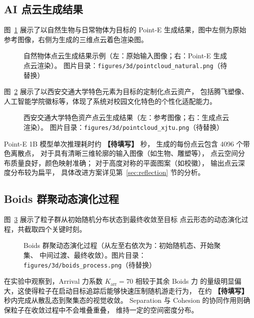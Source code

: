 \subsection{AI 点云生成结果}

图~\ref{fig:pointcloud_natural} 展示了以自然生物与日常物体为目标的
Point-E 生成结果，图中左侧为原始参考图像，右侧为生成的三维点云着色渲染图。

\begin{figure}[htbp]
  \centering
  \fbox{\rule{0pt}{5cm}\rule{14cm}{0pt}}
  \caption{自然物体点云生成结果示例（左：原始输入图像；右：Point-E 生成点云渲染）。
           图片目录：\texttt{figures/3d/pointcloud\_natural.png}（待替换）}
  \label{fig:pointcloud_natural}
\end{figure}

图~\ref{fig:pointcloud_xjtu} 展示了以西安交通大学特色元素为目标的定制化点云资产，
包括腾飞塑像、人工智能学院徽标等，体现了系统对校园文化特色的个性化适配能力。

\begin{figure}[htbp]
  \centering
  \fbox{\rule{0pt}{5cm}\rule{14cm}{0pt}}
  \caption{西安交通大学特色资产点云生成结果（左：参考图像；右：生成点云渲染）。
           图片目录：\texttt{figures/3d/pointcloud\_xjtu.png}（待替换）}
  \label{fig:pointcloud_xjtu}
\end{figure}

Point-E 1B 模型单次推理耗时约 \textbf{【待填写】} 秒，
生成的每份点云包含 4096 个带色离散点，
对于具有清晰三维轮廓的输入图像（如生物、雕塑等），
点云空间分布质量良好，颜色映射准确；
对于高度对称的平面图案（如校徽），
输出点云深度分布较为扁平，
具体改进方案详见第~\ref{sec:reflection} 节的分析。

\subsection{Boids 群聚动态演化过程}

图~\ref{fig:boids_process} 展示了粒子群从初始随机分布状态到最终收敛至目标
点云形态的动态演化过程，共截取四个关键时刻。

\begin{figure}[htbp]
  \centering
  \fbox{\rule{0pt}{6cm}\rule{14cm}{0pt}}
  \caption{Boids 群聚动态演化过程（从左至右依次为：初始随机态、开始聚集、
           中间过渡、最终收敛）。图片目录：\texttt{figures/3d/boids\_process.png}（待替换）}
  \label{fig:boids_process}
\end{figure}

在实验中观察到，Arrival 力系数 $K_{\mathrm{arr}}=70$ 相较于其余 Boids 力
的量级明显偏大，这使得粒子在启动目标追踪后能够快速压制随机游走行为，
在约 \textbf{【待填写】} 秒内完成从散乱态到聚集态的视觉收敛。
Separation 与 Cohesion 的协同作用则确保粒子在收敛过程中不会堆叠重叠，
维持一定的空间密度分布。

